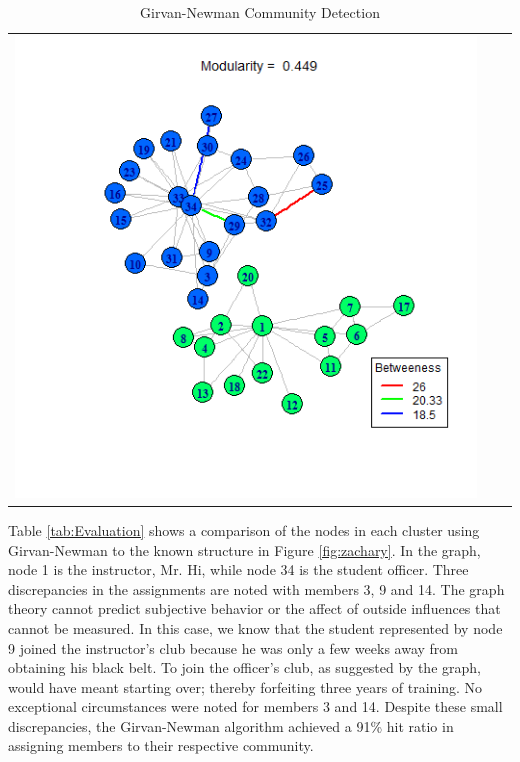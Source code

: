 \documentclass[letterpaper,11pt]{report}
\begin{document}
\begin{savenotes}
\begin{table}[htbp]
\begin{tabular}{ccc}
			\includegraphics[scale=0.25]{karateClub-community-0013.png} &
			&  \\
		\end{tabular}
	\caption{Girvan-Newman Community Detection}
	\label{tab:GirvanNewmanCommunityDetection}
\end{table}

\indent{}Table \ref{tab:Evaluation} shows a comparison of the nodes in each cluster using Girvan-Newman to the known structure in Figure \ref{fig:zachary}. In the graph, node 1 is the instructor, Mr. Hi, while node 34 is the student officer. Three discrepancies in the assignments are noted with members 3, 9 and 14. The graph theory cannot predict subjective behavior or the affect of outside influences that cannot be measured. In this case, we know that the student represented by node 9 joined the instructor's club because he was only a few weeks away from obtaining his black belt. To join the officer's club, as suggested by the graph, would have meant starting over; thereby forfeiting three years of training. No exceptional circumstances were noted for members 3 and 14. Despite these small discrepancies, the Girvan-Newman algorithm achieved a 91\% hit ratio in assigning members to their respective community.


\end{savenotes}
\end{document}
